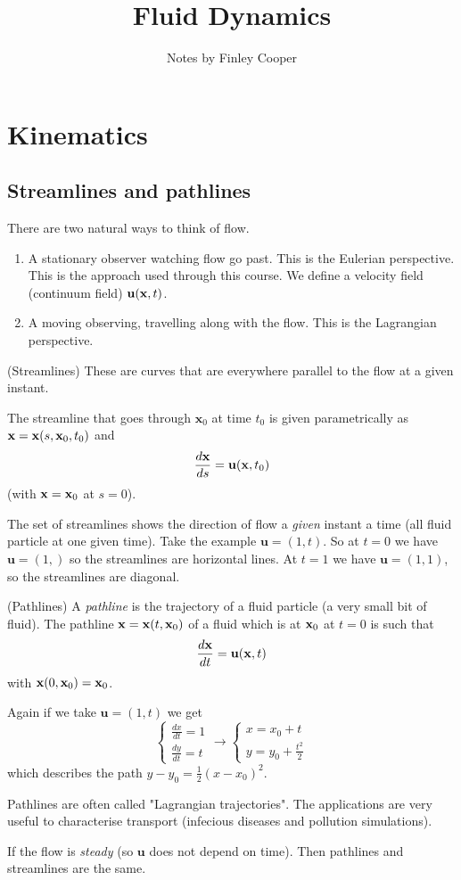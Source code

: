\documentclass{article}
\title{Fluid Dynamics}
\author{Notes by Finley Cooper}
\begin{document}
  \maketitle
  \newpage
  \tableofcontents
  \newpage
  \section{Kinematics}
  \subsection{Streamlines and pathlines}
  There are two natural ways to think of flow.
  \begin{enumerate}
	  \item A stationary observer watching flow go past. This is the Eulerian perspective. This is the approach used through this course. We define a velocity field (continuum field) $ \mathbf u(\mathbf{x}, t) $.
	  \item A moving observing, travelling along with the flow. This is the Lagrangian perspective.   
  \end{enumerate}
  \begin{definition}
	  (Streamlines) These are curves that are everywhere parallel to the flow at a given instant.
  \end{definition}
  \begin{remark}
    The streamline that goes through $ \mathbf x_0 $ at time $ t_0 $ is given parametrically as $ \mathbf{x} = \mathbf{x}(s, \mathbf{x}_0,t_0) $ and
    \[
	    \frac{d\mathbf{x}}{ds}=\mathbf u(\mathbf{x}, t_0)
    \]
    (with $ \mathbf{x}=\mathbf{x}_0 $ at $ s=0 $).
  \end{remark}
  The set of streamlines shows the direction of flow a \textit{given} instant a time (all fluid particle at one given time).
  Take the example $ \mathbf u = (1,t) $. So at $ t=0 $ we have $ \mathbf u=(1,) $ so the streamlines are horizontal lines. At $ t=1 $ we have $ \mathbf u = (1,1) $, so the streamlines are diagonal.
  \begin{definition}
	  (Pathlines) A \textit{pathline} is the trajectory of a fluid particle (a very small bit of fluid). The pathline $ \mathbf{x}=\mathbf{x}(t,\mathbf{x}_0) $ of a fluid which is at $ \mathbf{x}_0 $ at $ t=0 $ is such that
	  \[
		  \frac{d\mathbf{x}}{dt}=\mathbf u(\mathbf{x},t)
	  \]
	  with $ \mathbf{x}(0,\mathbf{x}_0)=\mathbf{x}_0 $.
  \end{definition}
  Again if we take $ \mathbf u = (1,t) $ we get
  \[
    \begin{cases}
	    \frac{dx}{dt}=1 \\
	    \frac{dy}{dt}=t
    \end{cases}\rightarrow \begin{cases}
      x=x_0+t\\
      y=y_0 +\frac{t^2}2
    \end{cases}
  \]
  which describes the path $ y-y_0=\frac12(x-x_0)^2 $.
\begin{remark}
  Pathlines are often called "Lagrangian trajectories". The applications are very useful to characterise transport (infecious diseases and pollution simulations).
\end{remark}
	If the flow is \textit{steady} (so $ \mathbf u $ does not depend on time). Then pathlines and streamlines are the same.
\end{document}
